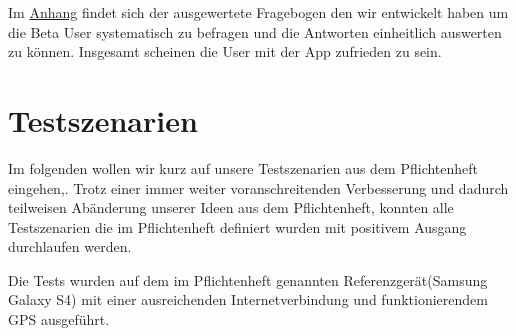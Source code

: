 \documentclass{scrartcl}
\begin{document}
		Im \hyperlink{Anhang}{Anhang} findet sich der ausgewertete Fragebogen den wir entwickelt haben um die Beta User systematisch zu befragen und die Antworten einheitlich auswerten zu können. Insgesamt scheinen die User mit der App zufrieden zu sein.

\newpage
\section{Testszenarien}
Im folgenden wollen wir kurz auf unsere Testszenarien aus dem Pflichtenheft eingehen,.
Trotz einer immer weiter voranschreitenden Verbesserung und dadurch teilweisen Abänderung unserer Ideen aus dem Pflichtenheft, konnten alle Testszenarien die im Pflichtenheft definiert wurden mit positivem Ausgang durchlaufen werden.

Die Tests wurden auf dem im Pflichtenheft genannten Referenzgerät(Samsung Galaxy S4) mit einer ausreichenden Internetverbindung und funktionierendem GPS ausgeführt. \newline
\end{document}
